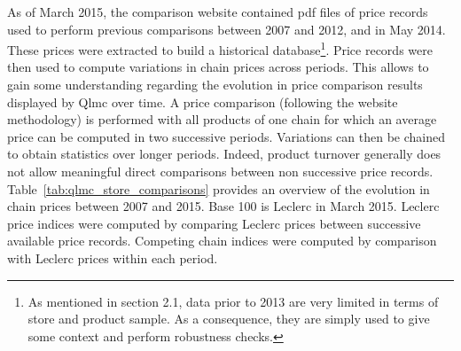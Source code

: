 \documentclass[english]{article}
\begin{document}
As of March 2015, the comparison website contained pdf files of price records used to perform previous comparisons between 2007 and 2012, and in May 2014. These prices were extracted to build a historical database\footnote{As mentioned in section 2.1, data prior to 2013 are very limited in terms of store and product sample. As a consequence, they are simply used to give some context and perform robustness checks.}. Price records were then used to compute variations in chain prices across periods. This allows to gain some understanding regarding the evolution in price comparison results displayed by Qlmc over time. A price comparison (following the website methodology) is performed with all products of one chain for which an average price can be computed in two successive periods. Variations can then be chained to obtain statistics over longer periods. Indeed, product turnover generally does not allow meaningful direct comparisons between non successive price records. Table~\ref{tab:qlmc_store_comparisons} provides an overview of the evolution in chain prices between 2007 and 2015. Base 100 is Leclerc in March 2015. Leclerc price indices were computed by comparing Leclerc prices between successive available price records. Competing chain indices were computed by comparison with Leclerc prices within each period.
\end{document}
